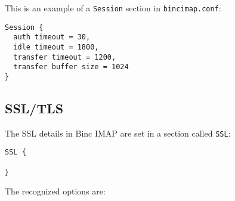 \documentclass[11pt,a4paper,twoside,openright]{report}
\begin{document}
This is an example of a \texttt{Session} section in
\texttt{bincimap.conf}:

\begin{Verbatim}
Session {
  auth timeout = 30,
  idle timeout = 1800,
  transfer timeout = 1200,
  transfer buffer size = 1024
}
\end{Verbatim}

\subsection{SSL/TLS}

The SSL details in Binc IMAP are set in a section called \texttt{SSL}:

\begin{Verbatim}
SSL {

}
\end{Verbatim}
The recognized options are:
\end{document}
